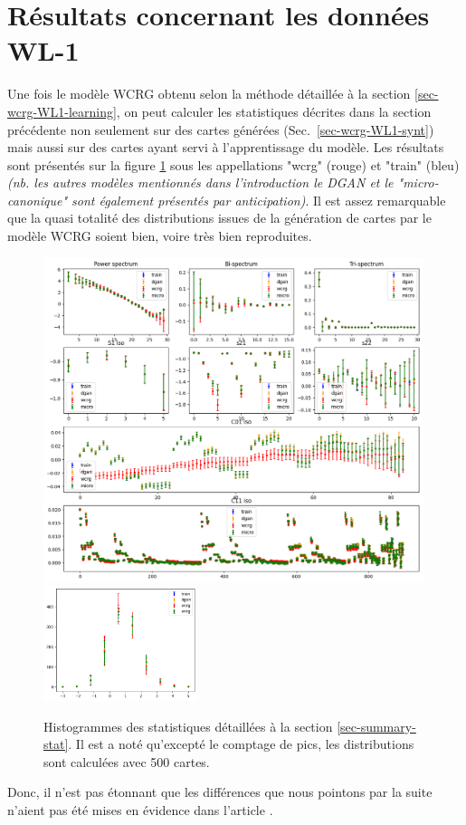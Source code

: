 \documentclass[12pt,twoside]{article}
\begin{document}
\section{Résultats concernant les données WL-1}
\label{sec-WL1-res}
%
Une fois le modèle WCRG obtenu selon la méthode détaillée à la section \ref{sec-wcrg-WL1-learning}, on peut calculer les statistiques décrites dans la section précédente non seulement sur des cartes générées (Sec.~\ref{sec-wcrg-WL1-synt}) mais aussi sur des cartes ayant servi à l'apprentissage du modèle. Les résultats sont présentés sur la figure \ref{fig-WL1-summary-stat} sous les appellations "wcrg" (rouge) et "train" (bleu) \textit{(nb. les autres modèles mentionnés dans l'introduction le DGAN et le "micro-canonique" sont également présentés par anticipation)}. Il est assez remarquable que la quasi totalité des distributions issues de la génération de cartes par le modèle WCRG soient bien, voire très bien reproduites. 
\begin{figure}
\centering
\includegraphics[width=0.99\textwidth]{fig-WL1-summary-stat.png}\\
\includegraphics[width=0.4\textwidth]{fig-WL1-peak-count.png}
\caption{Histogrammes des statistiques détaillées à la section \ref{sec-summary-stat}. Il est a noté qu'excepté le comptage de pics, les distributions sont calculées avec 500 cartes.}
\label{fig-WL1-summary-stat}
\end{figure}
Donc, il n'est pas étonnant que les différences que nous pointons par la suite n'aient pas été mises en évidence dans l'article \cite{2023arXiv230600181G}. 
\end{document}
